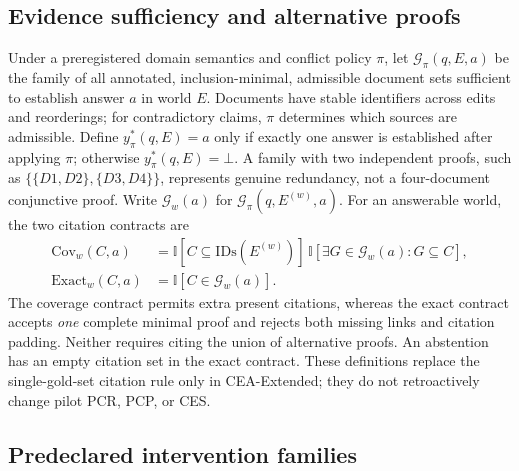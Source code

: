 \documentclass[10pt,twocolumn]{article}
\newcommand{\ind}{\mathbb{I}}
\newcommand{\botans}{\bot}
\begin{document}
\subsection{Evidence sufficiency and alternative proofs}

Under a preregistered domain semantics and conflict policy $\pi$, let
$\mathcal{G}_{\pi}(q,E,a)$ be the family of all annotated, inclusion-minimal,
admissible document sets sufficient to establish answer $a$ in world $E$.
Documents have stable identifiers across edits and reorderings; for
contradictory claims, $\pi$ determines which sources are admissible. Define
$y^*_{\pi}(q,E)=a$ only if exactly one answer is established after applying
$\pi$; otherwise $y^*_{\pi}(q,E)=\botans$. A family with two independent
proofs, such as $\{\{D1,D2\},\{D3,D4\}\}$, represents genuine redundancy,
not a four-document conjunctive proof. Write $\mathcal{G}_w(a)$ for
$\mathcal{G}_{\pi}(q,E^{(w)},a)$. For an answerable world, the two
citation contracts are
\begin{align}
\mathrm{Cov}_{w}(C,a)
 &= \ind[C\subseteq\mathrm{IDs}(E^{(w)})]\,
    \ind[\exists G\in\mathcal{G}_w(a):G\subseteq C],\\
\mathrm{Exact}_{w}(C,a)
 &= \ind[C\in\mathcal{G}_w(a)].
\end{align}
The coverage contract permits extra present citations, whereas the exact
contract accepts \emph{one} complete minimal proof and rejects both missing
links and citation padding. Neither requires citing the union of alternative
proofs. An abstention has an empty citation set in the exact contract.
These definitions replace the single-gold-set citation rule only in
CEA-Extended; they do not retroactively change pilot PCR, PCP, or CES.

\subsection{Predeclared intervention families}
\end{document}
